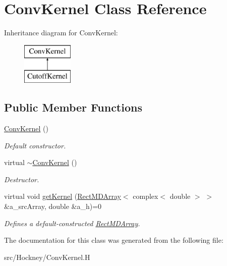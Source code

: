 \hypertarget{class_conv_kernel}{}\section{Conv\+Kernel Class Reference}
\label{class_conv_kernel}
Inheritance diagram for Conv\+Kernel\+:\begin{figure}[H]
\begin{center}
\leavevmode
\includegraphics[height=2.000000cm]{class_conv_kernel}
\end{center}
\end{figure}
\subsection*{Public Member Functions}
\begin{DoxyCompactItemize}
\item 
\mbox{\label{class_conv_kernel_ab248f15217152f184686de1d0f2e198b}} 
\hyperlink{class_conv_kernel_ab248f15217152f184686de1d0f2e198b}{Conv\+Kernel} ()
\begin{DoxyCompactList}\small\item\em Default constructor. \end{DoxyCompactList}\item 
\mbox{\label{class_conv_kernel_ac89fb6a91e458daab100910405be97f3}} 
virtual \hyperlink{class_conv_kernel_ac89fb6a91e458daab100910405be97f3}{$\sim$\+Conv\+Kernel} ()
\begin{DoxyCompactList}\small\item\em Destructor. \end{DoxyCompactList}\item 
\mbox{\label{class_conv_kernel_a97d8ad0d7784ba0861c1dcd72bab1f80}} 
virtual void \hyperlink{class_conv_kernel_a97d8ad0d7784ba0861c1dcd72bab1f80}{get\+Kernel} (\hyperlink{class_rect_m_d_array}{Rect\+M\+D\+Array}$<$ complex$<$ double $>$ $>$ \&a\+\_\+src\+Array, double \&a\+\_\+h)=0
\begin{DoxyCompactList}\small\item\em Defines a default-\/constructed \hyperlink{class_rect_m_d_array}{Rect\+M\+D\+Array}. \end{DoxyCompactList}\end{DoxyCompactItemize}


The documentation for this class was generated from the following file\+:\begin{DoxyCompactItemize}
\item 
src/\+Hockney/Conv\+Kernel.\+H\end{DoxyCompactItemize}
